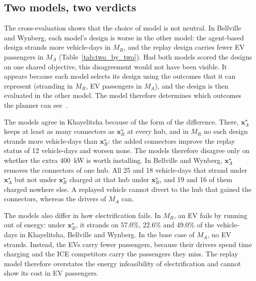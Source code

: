 \documentclass{elsarticle}
\newcommand{\MR}{\ensuremath{M_R}}
\newcommand{\MA}{\ensuremath{M_A}}
\newcommand{\xR}{\ensuremath{\mathbf{x}_R^{\star}}}
\newcommand{\xA}{\ensuremath{\mathbf{x}_A^{\star}}}
\begin{document}
\subsection{Two models, two verdicts}

The cross-evaluation shows that the choice of model is not neutral. In Bellville and Wynberg, each model's design is worse in the other model: the agent-based design strands more vehicle-days in \MR, and the replay design carries fewer EV passengers in \MA{} (Table~\ref{tab:two_by_two}). Had both models scored the designs on one shared objective, this disagreement would not have been visible. It appears because each model selects its design using the outcomes that it can represent (stranding in \MR, EV passengers in \MA), and the design is then evaluated in the other model. The model therefore determines which outcomes the planner can see~\cite{sello2026_planning_paradigms}.

The models agree in Khayelitsha because of the form of the difference. There, \xA{} keeps at least as many connectors as \xR{} at every hub, and in \MR{} no such design strands more vehicle-days than \xR: the added connectors improve the replay status of 12 vehicle-days and worsen none. The models therefore disagree only on whether the extra 400~kW is worth installing. In Bellville and Wynberg, \xA{} removes the connectors of one hub. All 25 and 18 vehicle-days that strand under \xA{} but not under \xR{} charged at that hub under \xR, and 19 and 16 of them charged nowhere else. A replayed vehicle cannot divert to the hub that gained the connectors, whereas the drivers of \MA{} can.

The models also differ in how electrification fails. In \MR, an EV fails by running out of energy: under \xR, it strands on 57.0\%, 22.6\% and 49.0\% of the vehicle-days in Khayelitsha, Bellville and Wynberg. In the base case of \MA, no EV strands. Instead, the EVs carry fewer passengers, because their drivers spend time charging and the ICE competitors carry the passengers they miss. The replay model therefore overstates the energy infeasibility of electrification and cannot show its cost in EV passengers.
\end{document}
